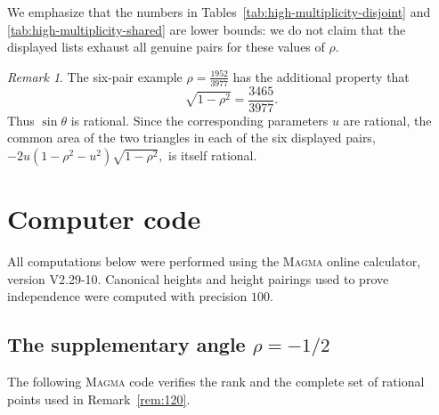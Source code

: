 \documentclass[11pt]{amsart}
\theoremstyle{plain}
\theoremstyle{remark}
\newtheorem{rem}[thm]{Remark}
\theoremstyle{plain}
\begin{document}
We emphasize that the numbers in
Tables~\ref{tab:high-multiplicity-disjoint} and
\ref{tab:high-multiplicity-shared} are lower bounds: we do not claim
that the displayed lists exhaust all genuine pairs for these values
of $\rho$.

\begin{rem}
The six-pair example $\rho=\frac{1952}{3977}$ has the additional
property that
\[
\sqrt{1-\rho^2}
=
\frac{3465}{3977}.
\]
Thus $\sin\theta$ is rational.
Since the corresponding parameters $u$ are rational, the common
area of the two triangles in each of the six displayed pairs,
$
-2u(1-\rho^2-u^2)\sqrt{1-\rho^2},
$
is itself rational.
\end{rem}


\appendix
\section{Computer code}\label{app:code}

All computations below were performed using the  \textsc{Magma} \cite{Magma} online calculator, version V2.29-10. Canonical heights and height pairings used to prove independence were computed with precision $100$.



\subsection{The supplementary angle $\rho=-1/2$}
\label{app:rho-minus-half}

The following \textsc{Magma} code verifies the rank and the complete
set of rational points used in Remark~\ref{rem:120}.
\end{document}
